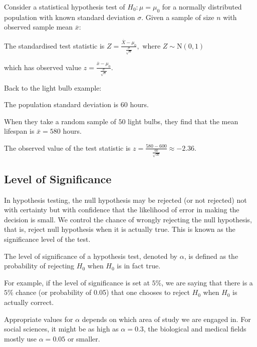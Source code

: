 \documentclass[11pt,a4paper]{book}
\begin{document}
\begin{tcolorbox}[colback=blue!5, colframe=black, boxrule=.4pt, sharpish corners]

Consider a statistical hypothesis test of $H_{0}:\mu=\mu_{0}$ for
a normally distributed population with known standard deviation $\sigma$.
Given a sample of size $n$ with observed sample mean $\overline{x}$:

The standardised test statistic is ${\displaystyle Z=\frac{\overline{X}-\mu_{0}}{\frac{\sigma}{\sqrt{n}}}},\text{ where }Z\sim\text{N}\left(0,1\right)$

which has observed value ${\displaystyle z=\frac{\overline{x}-\mu_{0}}{\frac{\sigma}{\sqrt{n}}}}$.
\end{tcolorbox}

Back to the light bulb example:

The population standard deviation is $60$ hours.

When they take a random sample of $50$ light bulbs, they find that
the mean lifespan is $\bar{x}=580$ hours.

The observed value of the test statistic is ${\displaystyle z=\frac{580-600}{\frac{60}{\sqrt{50}}}}\approx-2.36$.

\subsection{Level of Significance}

In hypothesis testing, the null hypothesis may be rejected (or not
rejected) not with certainty but with confidence that the likelihood
of error in making the decision is small. We control the chance of
wrongly rejecting the null hypothesis, that is, reject null hypothesis
when it is actually true. This is known as the significance level
of the test.

\begin{tcolorbox}[colback=blue!5, colframe=black, boxrule=.4pt, sharpish corners]

The level of significance of a hypothesis test, denoted by $\alpha$,
is defined as the probability of rejecting $H_{0}$ when $H_{0}$
is in fact true.
\end{tcolorbox}

For example, if the level of significance is set at $5\%$, we are
saying that there is a $5\%$ chance (or probability of 0.05) that
one chooses to reject $H_{0}$ when $H_{0}$ is actually correct.

Appropriate values for $\alpha$ depends on which area of study we
are engaged in. For social sciences, it might be as high as $\alpha=0.3$,
the biological and medical fields mostly use $\alpha=0.05$ or smaller.
\end{document}
